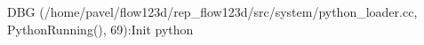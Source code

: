  DBG (/home/pavel/flow123d/rep\_flow123d/src/system/python\_loader.cc, PythonRunning(), 69):Init python
